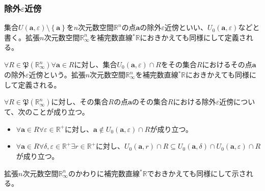 \documentclass[dvipdfmx]{jsarticle}
\begin{document}
\subsubsection{除外$\varepsilon$近傍}%
\begin{dfn}
集合$U\left( \mathbf{a},\varepsilon \right) \setminus \left\{ \mathbf{a} \right\}$を$n$次元数空間$\mathbb{R}^{n}$の点$\mathbf{a}$の除外$\varepsilon$近傍といい、$U_{0}\left( \mathbf{a},\varepsilon \right)$などと書く。拡張$n$次元数空間$\mathbb{R}_{\infty}^{n}$を補完数直線${}^{*}\mathbb{R}$におきかえても同様にして定義される。
\end{dfn}
\begin{dfn}
$\forall R \in \mathfrak{P}\left( \mathbb{R}_{\infty}^{n} \right)\forall\mathbf{a} \in R$に対し、集合$U_{0}\left( \mathbf{a},\varepsilon \right) \cap R$をその集合$R$におけるその点$\mathbf{a}$の除外$\varepsilon$近傍という。拡張$n$次元数空間$\mathbb{R}_{\infty}^{n}$を補完数直線${}^{*}\mathbb{R}$におきかえても同様にして定義される。
\end{dfn}
\begin{thm}\label{4.1.3.6}
$\forall R \in \mathfrak{P}\left( \mathbb{R}_{\infty}^{n} \right)$に対し、その集合$R$の点$\mathbf{a}$のその集合$R$における除外$\varepsilon$近傍について、次のことが成り立つ。
\begin{itemize}
\item
  $\forall\mathbf{a} \in R\forall\varepsilon \in \mathbb{R}^{+}$に対し、$\mathbf{a} \notin U_{0}\left( \mathbf{a},\varepsilon \right) \cap R$が成り立つ。
\item
  $\forall\mathbf{a} \in R\forall\delta,\varepsilon \in \mathbb{R}^{+}\exists r \in \mathbb{R}^{+}$に対し、$U_{0}\left( \mathbf{a},r \right) \cap R \subseteq U_{0}\left( \mathbf{a},\delta \right) \cap U_{0}\left( \mathbf{a},\varepsilon \right) \cap R$が成り立つ。
\end{itemize}
拡張$n$次元数空間$\mathbb{R}_{\infty}^{n}$のかわりに補完数直線${}^{*}\mathbb{R}$でおきかえても同様にして示される。
\end{thm}
\end{document}
